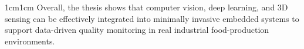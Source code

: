 \begin{Abstract}
\begin{changemargin}{1cm}{1cm}
        Overall, the thesis shows that computer vision, deep learning, and 3D sensing can be effectively integrated into minimally invasive embedded systems to support data-driven quality monitoring in real industrial food-production environments.
    \end{changemargin}
\end{Abstract}
